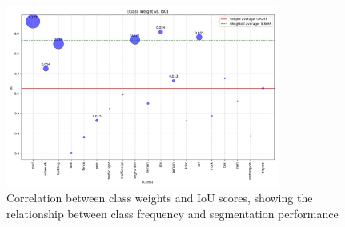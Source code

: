 \documentclass[]{article}
\begin{document}
\begin{figure}[htbp]
    \centering
    \includegraphics[width=0.8\textwidth]{outputs/deeplabv3plus_test_results/class_weight_vs_iou.png}
    \caption{Correlation between class weights and IoU scores, showing the relationship between class frequency and segmentation performance}
    \label{fig:class_weight_vs_iou}
\end{figure}
\end{document}
